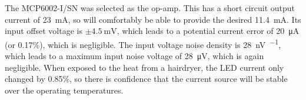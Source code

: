 

The MCP6002-I/SN \cite{mcp6002} was selected as the op-amp. This has a short circuit output current of \SI{23}{\milli\ampere}, so will comfortably be able to provide the desired \SI{11.4}{\milli\ampere}. Its input offset voltage is $\pm\SI{4.5}{\milli\volt}$, which leads to a potential current error of \SI{20}{\micro\ampere} (or 0.17\%), which is negligible. The input voltage noise density is \SI{28}{\nano\volt\per\sqrt{\hertz}}, which leads to a maximum input noise voltage of \SI{28}{\micro\volt}, which is again negligible. When exposed to the heat from a hairdryer, the LED current only changed by 0.85\%, so there is confidence that the current source will be stable over the operating temperatures.\\


